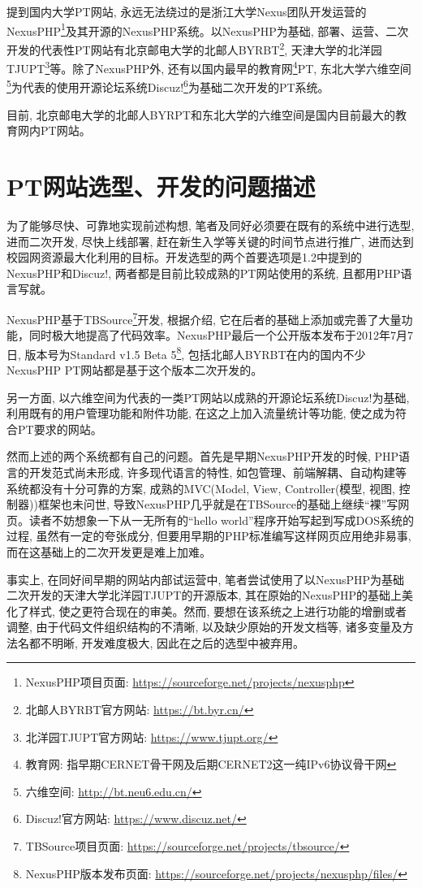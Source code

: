 提到国内大学PT网站, 永远无法绕过的是浙江大学Nexus团队开发运营的NexusPHP\footnote{NexusPHP项目页面: \url{https://sourceforge.net/projects/nexusphp}}及其开源的NexusPHP系统。以NexusPHP为基础, 部署、运营、二次开发的代表性PT网站有北京邮电大学的北邮人BYRBT\footnote{北邮人BYRBT官方网站: \url{https://bt.byr.cn/}}, 天津大学的北洋园TJUPT\footnote{北洋园TJUPT官方网站: \url{https://www.tjupt.org/}}等。除了NexusPHP外, 还有以国内最早的教育网\footnote{教育网: 指早期CERNET骨干网及后期CERNET2这一纯IPv6协议骨干网}PT, 东北大学六维空间\footnote{六维空间: \url{http://bt.neu6.edu.cn/}}为代表的使用开源论坛系统Discuz!\footnote{Discuz!官方网站: \url{https://www.discuz.net/}}为基础二次开发的PT系统。

目前, 北京邮电大学的北邮人BYRPT和东北大学的六维空间是国内目前最大的教育网内PT网站。

\section{PT网站选型、开发的问题描述}
\label{sec:related_work}
为了能够尽快、可靠地实现前述构想, 笔者及同好必须要在既有的系统中进行选型, 进而二次开发, 尽快上线部署, 赶在新生入学等关键的时间节点进行推广, 进而达到校园网资源最大化利用的目标。开发选型的两个首要选项是1.2中提到的NexusPHP和Discuz!, 两者都是目前比较成熟的PT网站使用的系统, 且都用PHP语言写就。

NexusPHP基于TBSource\footnote{TBSource项目页面: \url{https://sourceforge.net/projects/tbsource/}}开发, 根据介绍\cite{nexusteam2011about}, 它在后者的基础上添加或完善了大量功能，同时极大地提高了代码效率。NexusPHP最后一个公开版本发布于2012年7月7日, 版本号为Standard v1.5 Beta 5\footnote{NexusPHP版本发布页面: \url{https://sourceforge.net/projects/nexusphp/files/}}, 包括北邮人BYRBT在内的国内不少NexusPHP PT网站都是基于这个版本二次开发的。

另一方面, 以六维空间为代表的一类PT网站以成熟的开源论坛系统Discuz!为基础, 利用既有的用户管理功能和附件功能, 在这之上加入流量统计等功能, 使之成为符合PT要求的网站。

然而上述的两个系统都有自己的问题。首先是早期NexusPHP开发的时候, PHP语言的开发范式尚未形成, 许多现代语言的特性, 如包管理、前端解耦、自动构建等系统都没有十分可靠的方案, 成熟的MVC(Model, View, Controller(模型,  视图, 控制器))框架也未问世, 导致NexusPHP几乎就是在TBSource的基础上继续``裸''写网页。读者不妨想象一下从一无所有的``hello world''程序开始写起到写成DOS系统的过程, 虽然有一定的夸张成分, 但要用早期的PHP标准编写这样网页应用绝非易事, 而在这基础上的二次开发更是难上加难。

事实上, 在同好间早期的网站内部试运营中, 笔者尝试使用了以NexusPHP为基础二次开发的天津大学北洋园TJUPT的开源版本, 其在原始的NexusPHP的基础上美化了样式, 使之更符合现在的审美。然而, 要想在该系统之上进行功能的增删或者调整, 由于代码文件组织结构的不清晰, 以及缺少原始的开发文档等, 诸多变量及方法名都不明晰, 开发难度极大, 因此在之后的选型中被弃用。

